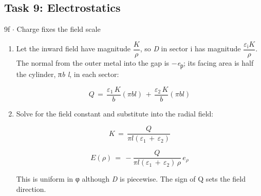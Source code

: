 \documentclass[11pt]{article}
\begin{document}
\begin{keepsection}\subsection{Task 9: Electrostatics}

\begin{workedbox}{9f \ensuremath{\cdot} Charge fixes the field scale}
\begin{enumerate}
\item {}
Let the inward field have magnitude {\small\ensuremath{\dfrac{{K}}{{ρ}}}}, so \textit{D} in sector i has magnitude {\small\ensuremath{\dfrac{ε_{\mathrm{i}}{K}}{{ρ}}}}. The normal from the outer metal into the gap is \ensuremath{-}\textit{e}\textsubscript{ρ}; its facing area is half the cylinder, π\textit{b l}, in each sector:

\begin{equation*}{Q}\, =\, \dfrac{ε_{1}\, {K}}{{b}}(π{b}{l})\, +\, \dfrac{ε_{2}\, {K}}{{b}}(π{b}{l})\end{equation*}
\item {}
Solve for the field constant and substitute into the radial field:

\begin{equation*}{K}\, =\, \dfrac{{Q}}{π{l}(ε_{1}\, +\, ε_{2})}\end{equation*}

\begin{equation*}{E}(ρ)\, =\, -\dfrac{{Q}}{π{l}(ε_{1}\, +\, ε_{2})\, ρ}\, {e}_{ρ}\end{equation*}

This is uniform in φ although \textit{D} is piecewise. The sign of Q sets the field direction.
\end{enumerate}
\end{workedbox}

\end{keepsection}
\end{document}
